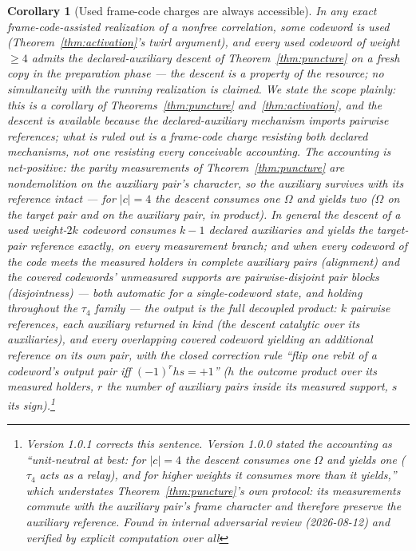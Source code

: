 \documentclass[11pt]{article}
\theoremstyle{plain}
\newtheorem{corollary}[theorem]{Corollary}
\theoremstyle{definition}
\theoremstyle{remark}
\theoremstyle{plain}
\newcommand{\Om}{\Omega}
\begin{document}
\begin{corollary}[Used frame-code charges are always accessible]
\label{thm:noirr}
In any exact frame-code-assisted realization of a nonfree
correlation, some codeword is used (Theorem~\ref{thm:activation}'s
twirl argument), and every used codeword of weight $\ge4$ admits
the declared-auxiliary descent of Theorem~\ref{thm:puncture} on a
fresh copy in the preparation phase --- the descent is a property
of the resource; no simultaneity with the running realization is
claimed. We state the scope plainly: this is a corollary of
Theorems~\ref{thm:puncture} and~\ref{thm:activation}, and the
descent is available \emph{because} the declared-auxiliary
mechanism imports pairwise references; what is ruled out is a
frame-code charge resisting both declared mechanisms, not one
resisting every conceivable accounting. The accounting is
net-positive: the parity measurements of
Theorem~\ref{thm:puncture} are nondemolition on the auxiliary
pair's character, so the auxiliary survives with its reference
intact --- for $|c| = 4$ the descent consumes one $\Om$ and
yields two ($\Om$ on the target pair \emph{and} on the auxiliary
pair, in product). In general the descent of a used
weight-$2k$ codeword consumes $k-1$ declared auxiliaries and
yields the target-pair reference exactly, on every measurement
branch; and when every codeword of the code meets the measured
holders in complete auxiliary pairs (\emph{alignment}) and the
covered codewords' unmeasured supports are pairwise-disjoint pair
blocks (\emph{disjointness}) --- both automatic for a
single-codeword state, and holding throughout the $\tau_4$ family
--- the output is the full decoupled product: $k$ pairwise
references, each auxiliary returned in kind (the descent catalytic
over its auxiliaries), and every overlapping covered codeword
yielding an additional reference on its own pair, with the closed
correction rule ``flip one rebit of a codeword's output pair iff
$(-1)^{r}hs=+1$'' ($h$ the outcome product over its measured
holders, $r$ the number of auxiliary pairs inside its measured
support, $s$ its sign).\footnote{Version
1.0.1 corrects this sentence. Version 1.0.0 stated the accounting
as ``unit-neutral at best: for $|c|=4$ the descent consumes one
$\Om$ and yields one ($\tau_4$ acts as a relay), and for higher
weights it consumes more than it yields,'' which understates
Theorem~\ref{thm:puncture}'s own protocol: its measurements
commute with the auxiliary pair's frame character and therefore
preserve the auxiliary reference. Found in internal adversarial
review (2026-08-12) and verified by explicit computation over all
}
\end{corollary}
\end{document}
